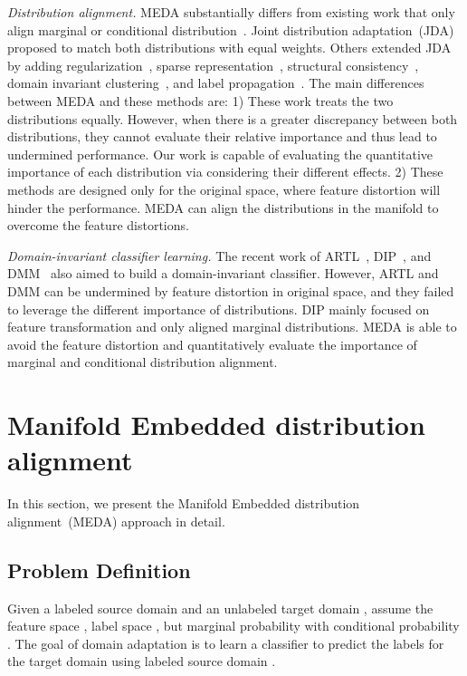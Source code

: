 \documentclass[sigconf]{acmart}
\begin{document}
\textit{Distribution alignment.} MEDA substantially differs from existing work that only align marginal or conditional distribution~\cite{pan2011domain}. Joint distribution adaptation~(JDA)~\cite{long2013transfer} proposed to match both distributions with equal weights. Others extended JDA by adding regularization~\cite{long2014adaptation}, sparse representation~\cite{xu2016discriminative}, structural consistency~\cite{hou2016unsupervised}, domain invariant clustering~\cite{tahmoresnezhad2016visual}, and label propagation~\cite{zhang2017joint}. The main differences between MEDA and these methods are: 1) These work treats the two distributions equally. However, when there is a greater discrepancy between both distributions, they cannot evaluate their relative importance and thus lead to undermined performance. Our work is capable of evaluating the quantitative importance of each distribution via considering their different effects. 2) These methods are designed only for the original space, where feature distortion will hinder the performance. MEDA can align the distributions in the manifold to overcome the feature distortions.

\textit{Domain-invariant classifier learning.} The recent work of ARTL~\cite{long2014adaptation}, DIP~\cite{baktashmotlagh2013unsupervised,baktashmotlagh2016distribution}, and DMM~\cite{cao2018unsupervised} also aimed to build a domain-invariant classifier. However, ARTL and DMM can be undermined by feature distortion in original space, and they failed to leverage the different importance of distributions. DIP mainly focused on feature transformation and only aligned marginal distributions. MEDA is able to avoid the feature distortion and quantitatively evaluate the importance of marginal and conditional distribution alignment.


\section{Manifold Embedded distribution alignment}
\label{sec-method}

In this section, we present the Manifold Embedded distribution alignment~(MEDA) approach in detail.

\subsection{Problem Definition}
Given a labeled source domain  and an unlabeled target domain , assume the feature space , label space , but marginal probability  with conditional probability . The goal of domain adaptation is to learn a classifier  to predict the labels  for the target domain  using labeled source domain .
\end{document}
